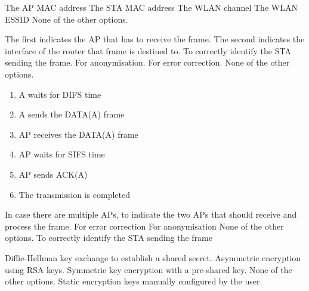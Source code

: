 \begin{checkboxes}
    \CorrectChoice The AP MAC address
    \CorrectChoice The STA MAC address
    \CorrectChoice The WLAN channel
    \choice The WLAN ESSID
    \choice None of the other options.
\end{checkboxes}


\begin{checkboxes}
    \CorrectChoice The first indicates the AP that has to receive the frame. The second indicates the interface of the router that frame is destined to.
    \choice To correctly identify the STA sending the frame.
    \choice For anonymisation.
    \choice For error correction.
    \choice None of the other options.
\end{checkboxes}

\begin{solution}
    \begin{enumerate}
        \item A waits for DIFS time
        \item A sends the DATA(A) frame
        \item AP receives the DATA(A) frame
        \item AP waits for SIFS time
        \item AP sends ACK(A)
        \item The transmission is completed
    \end{enumerate}
\end{solution}

\begin{checkboxes}
    \choice In case there are multiple APs, to indicate the two APs that should receive and process the frame.
    \choice For error correction
    \choice For anonymisation
    \CorrectChoice None of the other options.
    \choice To correctly identify the STA sending the frame
\end{checkboxes}

\begin{checkboxes}
    \CorrectChoice Diffie-Hellman key exchange to establish a shared secret.
    \choice Asymmetric encryption using RSA keys.
    \choice Symmetric key encryption with a pre-shared key.
    \choice None of the other options.
    \choice Static encryption keys manually configured by the user.
\end{checkboxes}

